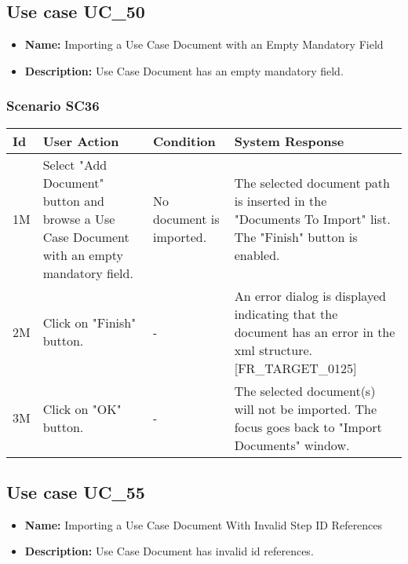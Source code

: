 \documentclass[a4paper,11pt]{article}
\newcommand{\bl}{\\ \hline}
\begin{document}
\subsection*{Use case UC_50}
\begin{itemize}
\item {\bf Name: }Importing a Use Case Document with an Empty Mandatory Field
			
\item {\bf Description: }Use Case Document has an empty mandatory field.
			
\end{itemize}
\subsubsection*{Scenario SC36}
\begin{tabular}{|p{0.4in}|p{1.5in}|p{1.5in}|p{1.5in}|}
\hline
Id & User Action & Condition & System Response \bl 
1M & Select "Add Document" button and browse a Use Case Document
						with an empty mandatory field.  & No document is imported. & The selected document path is inserted in the "Documents
						To Import" list. The "Finish" button is enabled.\bl
2M & Click on "Finish" button. & - & An error dialog is displayed indicating that the document
						has an error in the xml structure. [FR_TARGET_0125]\bl
3M & Click on "OK" button. & - & The selected document(s) will not be imported. The focus
						goes back to "Import Documents" window.\bl
\end{tabular}
\subsection*{Use case UC_55}
\begin{itemize}
\item {\bf Name: }Importing a Use Case Document With Invalid Step ID References
			
\item {\bf Description: }Use Case Document has invalid id references.
			
\end{itemize}
\end{document}
